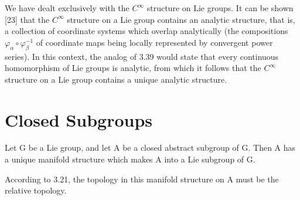 We have dealt exclusively with the $C^{\infty}$ structure on Lie groups. It can be shown [23] that the $C^{\infty}$ structure on a Lie group contains an analytic structure, that is, a collection of coordinate systems which overlap analytically (the compositions $\varphi_{\alpha}\circ\varphi_{\beta}^{-1}$ of coordinate maps being locally represented by convergent power series). In this context, the analog of 3.39 would state that every continuous homomorphism of Lie groups is analytic, from which it follows that the $C^{\infty}$ structure on a Lie group contains a unique analytic structure.

\section{Closed Subgroups}

\begin{theorem}\label{thm:3.42}
Let G be a Lie group, and let A be a closed abstract subgroup of G. Then A has a unique manifold structure which makes A into a Lie subgroup of G.

According to 3.21, the topology in this manifold structure on A must be the relative topology.

\end{theorem}

